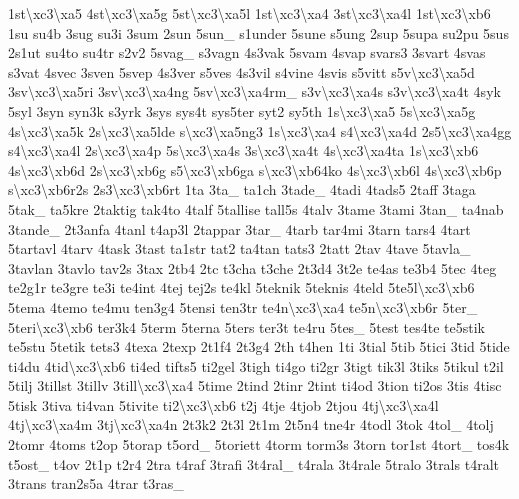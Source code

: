 \begin{DoxyCompactItemize}
1st\textbackslash{}xc3\textbackslash{}xa5 4st\textbackslash{}xc3\textbackslash{}xa5g 5st\textbackslash{}xc3\textbackslash{}xa5l 1st\textbackslash{}xc3\textbackslash{}xa4 3st\textbackslash{}xc3\textbackslash{}xa4l 1st\textbackslash{}xc3\textbackslash{}xb6 1su su4b 3sug su3i 3sum 2sun 5sun\-\_\- s1under 5sune s5ung 2sup 5supa su2pu 5sus 2s1ut su4to su4tr s2v2 5svag\-\_\- s3vagn 4s3vak 5svam 4svap svars3 3svart 4svas s3vat 4svec 3sven 5svep 4s3ver s5ves 4s3vil s4vine 4svis s5vitt s5v\textbackslash{}xc3\textbackslash{}xa5d 3sv\textbackslash{}xc3\textbackslash{}xa5ri 3sv\textbackslash{}xc3\textbackslash{}xa4ng 5sv\textbackslash{}xc3\textbackslash{}xa4rm\-\_\- s3v\textbackslash{}xc3\textbackslash{}xa4s s3v\textbackslash{}xc3\textbackslash{}xa4t 4syk 5syl 3syn syn3k s3yrk 3sys sys4t sys5ter syt2 sy5th 1s\textbackslash{}xc3\textbackslash{}xa5 5s\textbackslash{}xc3\textbackslash{}xa5g 4s\textbackslash{}xc3\textbackslash{}xa5k 2s\textbackslash{}xc3\textbackslash{}xa5lde s\textbackslash{}xc3\textbackslash{}xa5ng3 1s\textbackslash{}xc3\textbackslash{}xa4 s4\textbackslash{}xc3\textbackslash{}xa4d 2s5\textbackslash{}xc3\textbackslash{}xa4gg s4\textbackslash{}xc3\textbackslash{}xa4l 2s\textbackslash{}xc3\textbackslash{}xa4p 5s\textbackslash{}xc3\textbackslash{}xa4s 3s\textbackslash{}xc3\textbackslash{}xa4t 4s\textbackslash{}xc3\textbackslash{}xa4ta 1s\textbackslash{}xc3\textbackslash{}xb6 4s\textbackslash{}xc3\textbackslash{}xb6d 2s\textbackslash{}xc3\textbackslash{}xb6g s5\textbackslash{}xc3\textbackslash{}xb6ga s\textbackslash{}xc3\textbackslash{}xb64ko 4s\textbackslash{}xc3\textbackslash{}xb6l 4s\textbackslash{}xc3\textbackslash{}xb6p s\textbackslash{}xc3\textbackslash{}xb6r2s 2s3\textbackslash{}xc3\textbackslash{}xb6rt 1ta 3ta\-\_\- ta1ch 3tade\-\_\- 4tadi 4tads5 2taff 3taga 5tak\-\_\- ta5kre 2taktig tak4to 4talf 5tallise tall5s 4talv 3tame 3tami 3tan\-\_\- ta4nab 3tande\-\_\- 2t3anfa 4tanl t4ap3l 2tappar 3tar\-\_\- 4tarb tar4mi 3tarn tars4 4tart 5tartavl 4tarv 4task 3tast ta1str tat2 ta4tan tats3 2tatt 2tav 4tave 5tavla\-\_\- 3tavlan 3tavlo tav2s 3tax 2tb4 2tc t3cha t3che 2t3d4 3t2e te4as te3b4 5tec 4teg te2g1r te3gre te3i te4int 4tej tej2s te4kl 5teknik 5teknis 4teld 5te5l\textbackslash{}xc3\textbackslash{}xb6 5tema 4temo te4mu ten3g4 5tensi ten3tr te4n\textbackslash{}xc3\textbackslash{}xa4 te5n\textbackslash{}xc3\textbackslash{}xb6r 5ter\-\_\- 5teri\textbackslash{}xc3\textbackslash{}xb6 ter3k4 5term 5terna 5ters ter3t te4ru 5tes\-\_\- 5test tes4te te5stik te5stu 5tetik tets3 4texa 2texp 2t1f4 2t3g4 2th t4hen 1ti 3tial 5tib 5tici 3tid 5tide ti4du 4tid\textbackslash{}xc3\textbackslash{}xb6 ti4ed tifts5 ti2gel 3tigh ti4go ti2gr 3tigt tik3l 3tiks 5tikul t2il 5tilj 3tillst 3tillv 3till\textbackslash{}xc3\textbackslash{}xa4 5time 2tind 2tinr 2tint ti4od 3tion ti2os 3tis 4tisc 5tisk 3tiva ti4van 5tivite ti2\textbackslash{}xc3\textbackslash{}xb6 t2j 4tje 4tjob 2tjou 4tj\textbackslash{}xc3\textbackslash{}xa4l 4tj\textbackslash{}xc3\textbackslash{}xa4m 3tj\textbackslash{}xc3\textbackslash{}xa4n 2t3k2 2t3l 2t1m 2t5n4 tne4r 4todl 3tok 4tol\-\_\- 4tolj 2tomr 4toms t2op 5torap t5ord\-\_\- 5toriett 4torm torm3s 3torn tor1st 4tort\-\_\- tos4k t5ost\-\_\- t4ov 2t1p t2r4 2tra t4raf 3trafi 3t4ral\-\_\- t4rala 3t4rale 5tralo 3trals t4ralt 3trans tran2s5a 4trar t3ras\-\_\- 
\end{DoxyCompactItemize}
